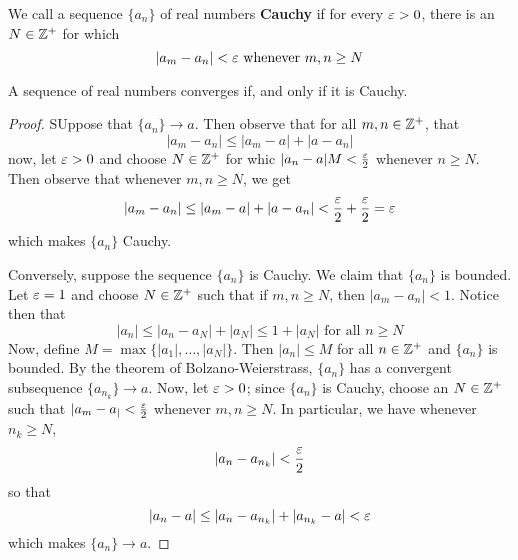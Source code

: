 \begin{definition}
    We call a sequence $\{a_n\}$ of real numbers \textbf{Cauchy} if for every
    $\varepsilon>0$, there is an  $N \in \mathbb{Z}^+$ for which
    \begin{equation*}
        |a_m-a_n|<\varepsilon \text{ whenever } m,n \geq N
    \end{equation*}
\end{definition}

\begin{theorem}\label{1.3.4}
    A sequence of real numbers converges if, and only if it is Cauchy.
\end{theorem}
\begin{proof}
    SUppose that $\{a_n\} \xrightarrow{} a$. Then observe that for all $m,n \in
    \mathbb{Z}^+$, that
    \begin{equation*}
        |a_m-a_n| \leq |a_m-a|+|a-a_n|
    \end{equation*}
    now, let $\varepsilon>0$ and choose  $N \in \mathbb{Z}^+$ for whic  $|a_n-a|M<\frac{\varepsilon}{2}$
    whenever $n \geq N$. Then observe that whenever $m,n \geq N$, we get
    \begin{equation*}
        |a_m-a_n| \leq |a_m-a|+|a-a_n|<\frac{\varepsilon}{2}+\frac{\varepsilon}{2}=\varepsilon
    \end{equation*}
    which makes $\{a_n\}$ Cauchy.

    Conversely, suppose the sequence $\{a_n\}$ is Cauchy. We claim that
    $\{a_n\}$ is bounded. Let $\varepsilon=1$ and choose $N \in \mathbb{Z}^+$ such that if  $m,n
    \geq N$, then  $|a_m-a_n|<1$. Notice then that
    \begin{equation*}
        |a_n| \leq |a_n-a_N|+|a_N| \leq 1+|a_N| \text{ for all } n \geq N
    \end{equation*}
    Now, define $M=\max{\{|a_1|, \dots, |a_N|\}}$. Then $|a_n| \leq M$ for all
    $n \in \mathbb{Z}^+$ and  $\{a_n\}$ is bounded. By the theorem of
    Bolzano-Weierstrass, $\{a_n\}$ has a convergent subsequence $\{a_{n_k}\}
    \xrightarrow{} a$. Now, let $\varepsilon>0$; since  $\{a_n\}$ is Cauchy, choose an $N
    \in \mathbb{Z}^+$ such that  $|a_m-a_|<\frac{\varepsilon}{2}$ whenever $m,n \geq N$. In
    particular, we have whenever  $n_k \geq N$,
    \begin{equation*}
        |a_n-a_{n_k}|<\frac{\varepsilon}{2}
    \end{equation*}
    so that
    \begin{equation*}
        |a_n-a| \leq |a_n-a_{n_k}|+|a_{n_k}-a|<\varepsilon
    \end{equation*}
    which makes $\{a_n\} \xrightarrow{} a$.
\end{proof}

